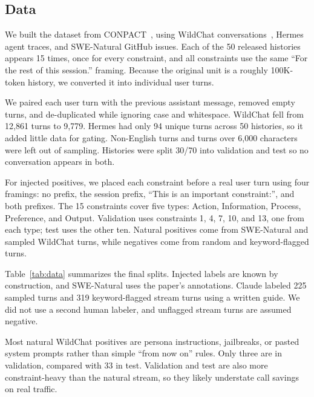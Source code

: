 \subsection{Data}
\label{sec:data}
We built the dataset from CONPACT~\cite{conpact}, using WildChat conversations~\cite{zhao2024wildchat}, Hermes agent traces, and SWE-Natural GitHub issues. Each of the 50 released histories appears 15 times, once for every constraint, and all constraints use the same ``For the rest of this session.'' framing. Because the original unit is a roughly 100K-token history, we converted it into individual user turns.

We paired each user turn with the previous assistant message, removed empty turns, and de-duplicated while ignoring case and whitespace. WildChat fell from 12,861 turns to 9,779. Hermes had only 94 unique turns across 50 histories, so it added little data for gating. Non-English turns and turns over 6,000 characters were left out of sampling. Histories were split 30/70 into validation and test so no conversation appears in both.

For injected positives, we placed each constraint before a real user turn using four framings: no prefix, the session prefix, ``This is an important constraint:'', and both prefixes. The 15 constraints cover five types: Action, Information, Process, Preference, and Output. Validation uses constraints 1, 4, 7, 10, and 13, one from each type; test uses the other ten. Natural positives come from SWE-Natural and sampled WildChat turns, while negatives come from random and keyword-flagged turns.

Table~\ref{tab:data} summarizes the final splits. Injected labels are known by construction, and SWE-Natural uses the paper's annotations. Claude labeled 225 sampled turns and 319 keyword-flagged stream turns using a written guide. We did not use a second human labeler, and unflagged stream turns are assumed negative.

Most natural WildChat positives are persona instructions, jailbreaks, or pasted system prompts rather than simple ``from now on'' rules. Only three are in validation, compared with 33 in test. Validation and test are also more constraint-heavy than the natural stream, so they likely understate call savings on real traffic.

